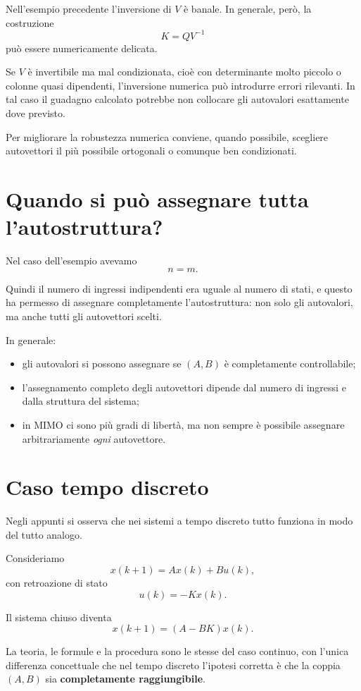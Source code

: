 Nell'esempio precedente l'inversione di \(V\) è banale.
In generale, però, la costruzione
\[
K=QV^{-1}
\]
può essere numericamente delicata.

Se \(V\) è invertibile ma mal condizionata, cioè con determinante molto piccolo o colonne quasi dipendenti,
l'inversione numerica può introdurre errori rilevanti.
In tal caso il guadagno calcolato potrebbe non collocare gli autovalori esattamente dove previsto.

Per migliorare la robustezza numerica conviene, quando possibile, scegliere autovettori
il più possibile ortogonali o comunque ben condizionati.

\section{Quando si può assegnare tutta l'autostruttura?}

Nel caso dell'esempio avevamo
\[
n=m.
\]

Quindi il numero di ingressi indipendenti era uguale al numero di stati,
e questo ha permesso di assegnare completamente l'autostruttura:
non solo gli autovalori, ma anche tutti gli autovettori scelti.

In generale:
\begin{itemize}
    \item gli autovalori si possono assegnare se \((A,B)\) è completamente controllabile;
    \item l'assegnamento completo degli autovettori dipende dal numero di ingressi e dalla struttura del sistema;
    \item in MIMO ci sono più gradi di libertà, ma non sempre è possibile assegnare arbitrariamente \emph{ogni} autovettore.
\end{itemize}

\section{Caso tempo discreto}

Negli appunti si osserva che nei sistemi a tempo discreto tutto funziona in modo del tutto analogo.

Consideriamo
\[
x(k+1)=Ax(k)+Bu(k),
\]
con retroazione di stato
\[
u(k)=-Kx(k).
\]

Il sistema chiuso diventa
\[
x(k+1)=(A-BK)x(k).
\]

La teoria, le formule e la procedura sono le stesse del caso continuo,
con l'unica differenza concettuale che nel tempo discreto l'ipotesi corretta è che
la coppia \((A,B)\) sia \textbf{completamente raggiungibile}.


